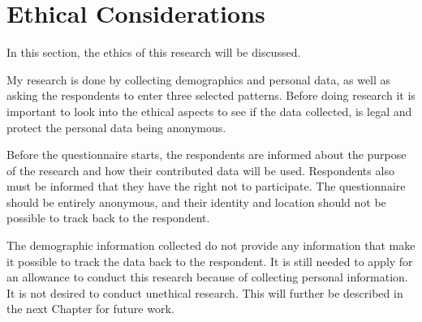 \section{Ethical Considerations}
\label{sec:ethical}

  In this section, the ethics of this research will be discussed.

  My research is done by collecting demographics and personal data, as well as asking the respondents to enter three selected patterns. Before doing research it is important to look into the ethical aspects to see if the data collected, is legal and protect the personal data being anonymous.

  Before the questionnaire starts, the respondents are informed about the purpose of the research and how their contributed data will be used. Respondents also must be informed that they have the right not to participate. The questionnaire should be entirely anonymous, and their identity and location should not be possible to track back to the respondent.

  The demographic information collected do not provide any information that make it possible to track the data back to the respondent. It is still needed to apply for an allowance to conduct this research because of collecting personal information. It is not desired to conduct unethical research. This will further be described in the next Chapter for future work.
  
